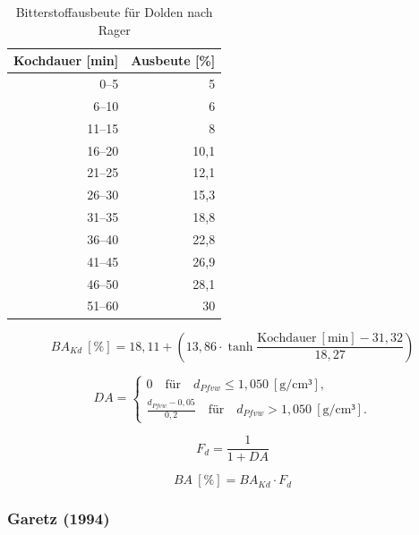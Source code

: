 \documentclass[a4paper,parskip=half]{scrartcl}
\newcommand{\BA}{\mathit{BA}}
\newcommand{\BAKt}{{\mathit{BA}}_{\mathit{Kd}}}
\newcommand{\umin}{\:[\textrm{min}]}
\newcommand{\uden}{\:[\text{g/cm³}]}
\newcommand{\uper}{\:[\text{\%}]}
\newcommand{\FKd}{F_{\mathit{d}}}
\begin{document}
\begin{table}[H]
\centering
\begin{tabular}{rr}
\toprule
\multicolumn{1}{c}{\textbf{Kochdauer [min]}} & \multicolumn{1}{c}{\textbf{Ausbeute [\%]}} \\
\midrule
0–5             & 5 \\
6–10            & 6 \\
11–15           & 8 \\
16–20           & 10,1 \\
21–25           & 12,1 \\
26–30           & 15,3 \\
31–35           & 18,8 \\
36–40           & 22,8 \\
41–45           & 26,9 \\
46–50           & 28,1 \\
51–60           & 30 \\
\bottomrule
\end{tabular}
\caption{Bitterstoffausbeute für Dolden nach Rager \parencite[54]{Rager1990}}
\label{table:ragerbakt}
\end{table}

\begin{equation}
\BAKt \uper = 18,11 + \left(13,86 \cdot \tanh{\frac{\text{Kochdauer} \umin - 31,32}{18,27}}\right)
\label{eq:ragerbakt}
\end{equation}


\begin{equation}
\mathit{DA} = \begin{cases}
0 \quad \text{für} \quad d_{\mathit{Pfvw}} \le 1,050 \uden, \\
\frac{d_{\mathit{Pfvw}} - 0,05}{0,2} \quad \text{für} \quad d_{\mathit{Pfvw}} > 1,050 \uden.
\end{cases}
\label{eq:ragerga}
\end{equation}

\begin{equation}
\FKd = \frac{1}{1 + \mathit{DA}}
\label{eq:ragerfkd}
\end{equation}


\begin{equation}
\BA \uper = \BAKt \cdot \FKd
\label{eq:ragerba}
\end{equation}

\subsubsection*{Garetz (1994)}
\end{document}

